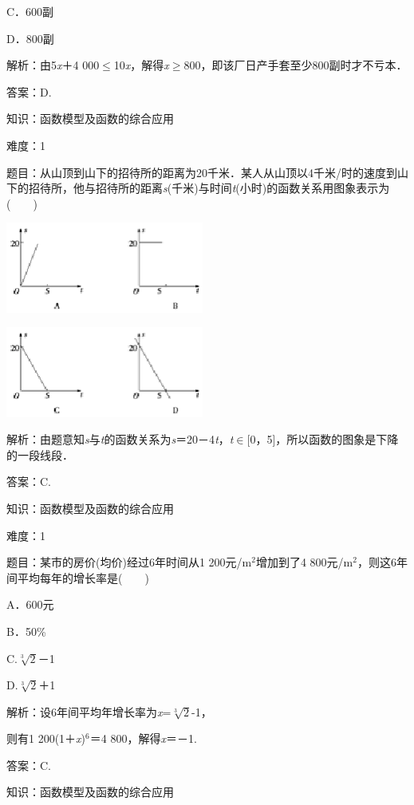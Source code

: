 \documentclass{article} %
\begin{document}
C．600副   

D．800副

解析：由5\textit{x}＋4 000$\mathrm{\le}$10\textit{x}，解得\textit{x}$\mathrm{\ge}$800，即该厂日产手套至少800副时才不亏本．

答案：D.

知识：函数模型及函数的综合应用

难度：1

题目：从山顶到山下的招待所的距离为20千米．某人从山顶以4千米/时的速度到山下的招待所，他与招待所的距离\textit{s}(千米)与时间\textit{t}(小时)的函数关系用图象表示为(　　)

\includegraphics*[width=2.56in, height=1.17in, keepaspectratio=false]{image80}

\includegraphics*[width=2.56in, height=1.17in, keepaspectratio=false]{image81}

解析：由题意知\textit{s}与\textit{t}的函数关系为\textit{s}＝20－4\textit{t}，\textit{t}$\mathrm{\in}$[0，5]，所以函数的图象是下降的一段线段．

答案：C.

知识：函数模型及函数的综合应用

难度：1

题目：某市的房价(均价)经过6年时间从1 200元/m${}^{2}$增加到了4 800元/m${}^{2}$，则这6年间平均每年的增长率是(　　)

A．600元   

B．50\%

C.$\sqrt[3]{2}$－1   

D.$\sqrt[3]{2}$＋1

解析：设6年间平均年增长率为\textit{x}=$\sqrt[3]{2}$-1，

则有1 200(1＋\textit{x})${}^{6}$＝4 800，解得\textit{x}＝－1.

答案：C.

知识：函数模型及函数的综合应用
\end{document}
